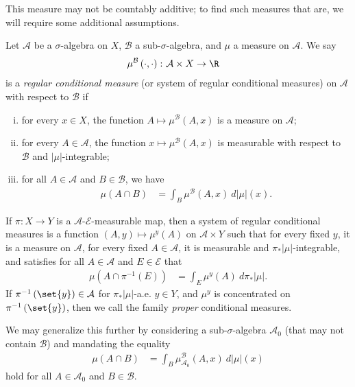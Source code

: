 \documentclass[10pt]{mypackage}
\begin{document}
This measure may not be countably additive; to find such measures that are, we will require some additional assumptions.
\begin{definition}
  Let $\mathcal{A}$ be a $\sigma$-algebra on $X$, $\mathcal{B}$ a sub-$\sigma$-algebra, and $\mu$ a measure on $ \mathcal{A} $. We say
  \begin{align*}
    \mu^{\mathcal{B}}\left( \cdot,\cdot \right) \colon \mathcal{A}\times X &\to \R
  \end{align*}
  is a \textit{regular conditional measure} (or system of regular conditional measures) on $ \mathcal{A} $ with respect to $ \mathcal{B} $ if
  \begin{enumerate}[(i)]
    \item for every $x\in X$, the function $A\mapsto \mu^{\mathcal{B}}\left( A,x \right)$ is a measure on $ \mathcal{A} $;
    \item for every $A\in \mathcal{A}$, the function $x\mapsto \mu^{\mathcal{B}}\left( A,x \right)$ is measurable with respect to $ \mathcal{B} $ and $ \left\vert \mu \right\vert $-integrable;
    \item for all $A\in \mathcal{A}$ and $B\in \mathcal{B}$, we have
      \begin{align*}
        \mu\left( A\cap B \right) &= \int_{B}^{} \mu^{\mathcal{B}}\left( A,x \right)\:d\left\vert \mu \right\vert(x).
      \end{align*}
  \end{enumerate}
\end{definition}
\begin{definition}
  If $\pi\colon X\to Y$ is a $\mathcal{A}$-$\mathcal{E}$-measurable map, then a system of regular conditional measures is a function $\left( A,y \right)\mapsto \mu^y(A)$ on $ \mathcal{A}\times Y $ such that for every fixed $y$, it is a measure on $ \mathcal{A} $, for every fixed $A\in \mathcal{A}$, it is measurable and $\pi_{\ast}\left\vert \mu \right\vert$-integrable, and satisfies for all $A\in \mathcal{A}$ and $E\in \mathcal{E}$ that
  \begin{align*}
    \mu\left( A\cap \pi^{-1}\left( E \right) \right) &= \int_{E}^{} \mu^y(A)\:d\pi_{\ast}\left\vert \mu \right\vert.
  \end{align*}
  If $\pi^{-1}\left( \set{y} \right)\in \mathcal{A}$ for $\pi_{\ast}\left\vert \mu \right\vert$-a.e. $y\in Y$, and $\mu^y$ is concentrated on $\pi^{-1}\left( \set{y} \right)$, then we call the family \textit{proper} conditional measures.
\end{definition}
We may generalize this further by considering a sub-$\sigma$-algebra $\mathcal{A}_0$ (that may not contain $\mathcal{B}$) and mandating the equality
\begin{align*}
  \mu\left( A\cap B \right) &= \int_{B}^{} \mu^{\mathcal{B}}_{\mathcal{A}_0}\left( A,x \right) \:d\left\vert \mu \right\vert(x)
\end{align*}
hold for all $A\in \mathcal{A}_0$ and $B\in \mathcal{B}$.
\end{document}
